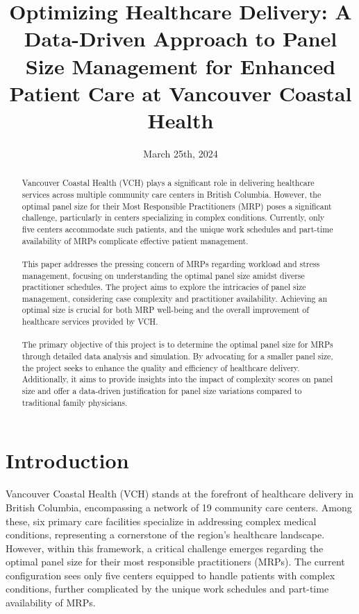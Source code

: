 \documentclass[11pt]{article}
\title{Optimizing Healthcare Delivery: A Data-Driven Approach to Panel Size Management for Enhanced Patient Care at Vancouver Coastal Health}
\date{March 25th, 2024}
\theoremstyle{definition}
\begin{document}
\maketitle

\begin{abstract}

Vancouver Coastal Health (VCH) plays a significant role in delivering healthcare services across multiple community care centers in British Columbia. However, the optimal panel size for their Most Responsible Practitioners (MRP) poses a significant challenge, particularly in centers specializing in complex conditions. Currently, only five centers accommodate such patients, and the unique work schedules and part-time availability of MRPs complicate effective patient management.\\\\
This paper addresses the pressing concern of MRPs regarding workload and stress management, focusing on understanding the optimal panel size amidst diverse practitioner schedules. The project aims to explore the intricacies of panel size management, considering case complexity and practitioner availability. Achieving an optimal size is crucial for both MRP well-being and the overall improvement of healthcare services provided by VCH.\\\\
The primary objective of this project is to determine the optimal panel size for MRPs through detailed data analysis and simulation. By advocating for a smaller panel size, the project seeks to enhance the quality and efficiency of healthcare delivery. Additionally, it aims to provide insights into the impact of complexity scores on panel size and offer a data-driven justification for panel size variations compared to traditional family physicians.

\end{abstract}
\newpage
\section{Introduction}
Vancouver Coastal Health (VCH) stands at the forefront of healthcare delivery in British Columbia, encompassing a network of 19 community care centers. Among these, six primary care facilities specialize in addressing complex medical conditions, representing a cornerstone of the region's healthcare landscape. However, within this framework, a critical challenge emerges regarding the optimal panel size for their most responsible practitioners (MRPs). The current configuration sees only five centers equipped to handle patients with complex conditions, further complicated by the unique work schedules and part-time availability of MRPs.\\
\end{document}
